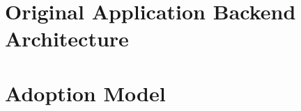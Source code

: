 \documentclass{Configuration_Files/PoliMi3i_thesis}
\begin{document}
    \section{Original Application Backend Architecture}
    \label{ap:originaldesigndoc}

    \section{Adoption Model}
    \label{ap:adoptionmodel}

\end{document}
